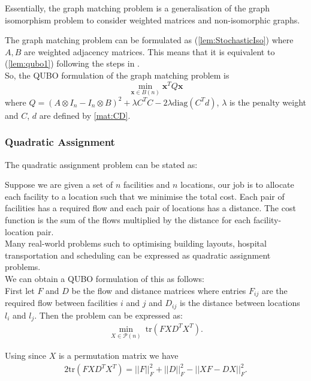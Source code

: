 \documentclass{article}
\begin{document}
\noindent Essentially, the graph matching problem is a generalisation of the graph isomorphism problem to consider weighted matrices and non-isomorphic graphs.

\noindent The graph matching problem can be formulated as (\ref{lem:StochasticIso}) where \(A,B\) are weighted adjacency matrices. This means that it is equivalent to (\ref{lem:qubo1}) following the steps in \cite{klus2023continuous}.\\

\noindent So, the QUBO formulation of the graph matching problem is
\begin{equation*}
	\min_{\mathbf{x} \in B(n)} \mathbf{x}^T Q \mathbf{x}
\end{equation*}
where \(Q = (A \otimes I_n - I_n \otimes B)^2 + \lambda C^T C - 2\lambda\text{diag}(C^T d)\), \(\lambda\) is the penalty weight and \(C\), \(d\) are defined by \ref{mat:CD}.\\

\subsubsection{Quadratic Assignment}

The quadratic assignment problem can be stated as:

Suppose we are given a set of \(n\) facilities and \(n\) locations, our job is to allocate each facility to a location such that we minimise the total cost. Each pair of facilities has a required flow and each pair of locations has a distance. The cost function is the sum of the flows multiplied by the distance for each facility-location pair.\\

\noindent Many real-world problems such to optimising building layouts, hospital transportation and scheduling can be expressed as quadratic assignment problems.\\

\noindent We can obtain a QUBO formulation of this as follows: \\
First let \(F\) and \(D\) be the flow and distance matrices where entries \(F_{ij}\) are the required flow between facilities \(i\) and \(j\) and \(D_{ij}\) is the distance between locations \(l_i\) and \(l_j\). Then the problem can be expressed as:
\begin{align*}
    \min_{X \in \mathcal{P}(n)} \: \text{tr}(FXD^TX^T).
\end{align*}

\noindent Using \cite[p.~3]{klus2023continuous} since \(X\) is a permutation matrix we have
\begin{align*}
    2\text{tr}(FXD^TX^T) = ||F||_F^2 + ||D||_F^2 - ||XF - DX||_F^2.
\end{align*}
\end{document}
